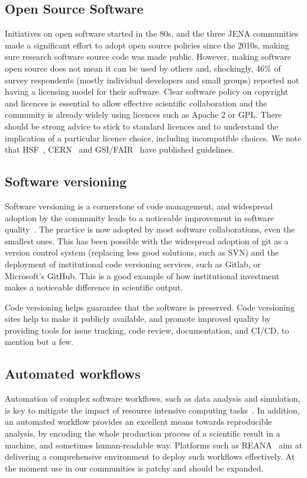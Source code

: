 \subsection{Open Source Software}

Initiatives on open software started in the 80s, and the three JENA communities made a significant effort to adopt open source policies since the 2010s, making sure research software source code was made public. However, making software open source does not mean it can be used by others and, shockingly, 46\% of survey respondents (mostly individual developers and small groups) reported not having a licensing model for their software.
Clear software policy on copyright and licences is essential to allow effective scientific collaboration and the community is already widely using licences such as Apache 2 or GPL. There should be strong advice to stick to standard licences and to understand the implication of a particular licence choice, including incompatible choices. We note that HSF~\cite{jouvin_2016_1469636}, CERN~\cite{Fluckiger:1482206} and GSI/FAIR~\cite{GSIFAIROpenSource} have published guidelines. 

\subsection{Software versioning}

Software versioning is a cornerstone of code management, and widespread adoption by the community leads to a noticeable improvement in software quality~\cite{swebok4}. The practice is now adopted by most software collaborations, even the smallest ones. This has been possible with the widespread adoption of git as a version control system (replacing less good solutions, such as SVN) and the deployment of institutional code versioning services, such as Gitlab, or Microsoft's GitHub. This is a good example of how institutional investment makes a noticeable difference in scientific output.

Code versioning helps guarantee that the software is preserved. Code versioning sites help to make it publicly available, and promote improved quality by providing tools for issue tracking, code review, documentation, and CI/CD, to mention but a few. 


\subsection{Automated workflows}

Automation of complex software workflows, such as data analysis and simulation, is key to mitigate the impact of resource intensive computing tasks~\cite{swebok4}. In addition, an automated workflow provides an excellent means towards reproducible analysis, by encoding the whole production process of a scientific result in a machine, and sometimes human-readable way. Platforms such as REANA~\cite{REANA} aim at delivering a comprehensive environment to deploy such workflows effectively. At the moment use in our communities is patchy and should be expanded.

